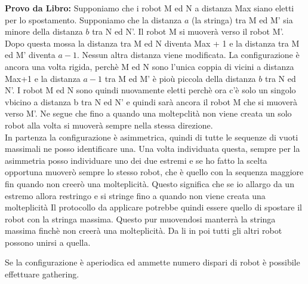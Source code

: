 \textbf{Provo da Libro:} Supponiamo che i robot M ed N a distanza Max siano
eletti per lo spostamento. Supponiamo che la distanza $a$ (la stringa) tra M ed
M' sia minore della distanza $b$ tra N ed N'. Il robot M si muoverà verso il
robot M'. Dopo questa mossa la distanza tra M ed N diventa Max + 1 e la distanza
tra M ed M' diventa $a-1$. Nessun altra distanza viene modificata. La
configurazione è ancora una volta rigida, perchè M ed N sono l'unica coppia di
vicini a distanza Max+1 e la distanza $a-1$ tra M ed M' è pioù piccola della
distanza $b$ tra N ed N'. I robot M ed N sono quindi nuovamente eletti perchè
ora c'è solo un singolo vbicino a distanza b tra N ed N' e quindi sarà ancora il
robot M che si muoverà verso M'. Ne segue che fino a quando una moltepclità non
viene creata un solo robot alla volta si muoverà sempre nella stessa
direzione.\\
In partenza la configurazione è asimmetrica, quindi di tutte le sequenze di
vuoti massimali ne posso identificare una. Una volta individuata questa, sempre
per la asimmetria posso individuare uno dei due estremi e se ho fatto la scelta
opportuna muoverò sempre lo stesso robot, che è quello con la sequenza maggiore
fin quando non creerò una molteplicità. Questo significa che se io allargo da un
estremo allora restringo e si stringe fino a quando non viene creata una
molteplicità Il protocollo da applicare potrebbe quindi essere quello di
spostare il robot con la stringa massima. Questo pur muovendosi manterrà la
stringa massima finchè non creerà una molteplicità. Da li in poi tutti gli altri
robot possono unirsi a quella.

\begin{theorem}
    Se la configurazione è aperiodica ed ammette numero dispari di robot è
    possibile effettuare gathering.
\end{theorem}

